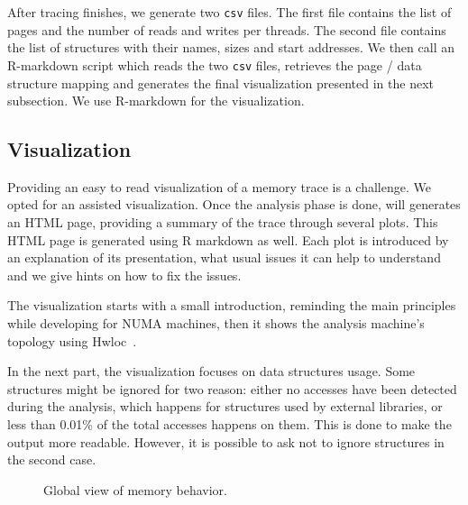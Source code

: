 After tracing finishes, we generate two \texttt{csv} files.
The first file contains the list of pages and the number of reads
and writes per threads. The second file contains the
list of structures with their names, sizes and start addresses.
We then call an R-markdown script which reads the two \texttt{csv} files,
retrieves the page / data structure mapping and generates the final
visualization presented in the next subsection. We use R-markdown
for the visualization.


\subsection{Visualization}
\label{sec:design-visu}

Providing an easy to read visualization of a memory trace is a challenge. We
opted for an assisted visualization. Once the analysis phase is done, \TABARNAC
will generates an HTML page, providing a summary of the trace through several
plots.  This HTML page is generated using R markdown as well.  Each plot is
introduced by an explanation of its presentation, what usual issues it can
help to understand and we give hints on how to fix the issues.

The visualization starts with a small introduction, reminding the main
principles while developing for NUMA machines, then it shows the analysis
machine's topology using Hwloc~\cite{Broquedis10hwloc}.

In the next part, the visualization focuses on data structures usage. Some
structures might be ignored for two reason: either no accesses have been
detected during the analysis, which happens for structures used by external
libraries, or less than 0.01\% of the total accesses happens on them. This is
done to make the output more readable. However, it is possible to ask
\TABARNAC not to ignore structures in the second case.

\begin{figure}[htb]
    \centering
    \label{fig:example_plot1}
    \caption{Global view of memory behavior.}
\end{figure}


